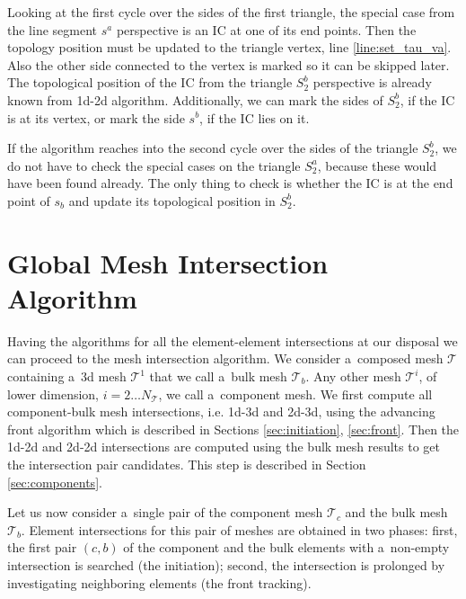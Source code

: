 Looking at the first cycle over the sides of the first triangle, the special case from the line segment $s^a$ perspective is
an IC at one of its end points. Then the topology position must be updated to the triangle vertex, line \ref{line:set_tau_va}.
Also the other side connected to the vertex is marked so it can be skipped later.
The topological position of the IC from the triangle $S^b_2$ perspective is already known from 1d-2d algorithm.
Additionally, we can mark the sides of $S^b_2$, if the IC is at its vertex, or mark the side $s^b$, if the IC lies on it.

If the algorithm reaches into the second cycle over the sides of the triangle $S^b_2$,
we do not have to check the special cases on the triangle $S^a_2$, because these would have been found already.
The only thing to check is whether the IC is at the end point of $s_b$ and update its topological position in $S^b_2$.

\section{Global Mesh Intersection Algorithm}
\label{sec:front_advancing}
Having the algorithms for all the element-element intersections at our disposal we can proceed to the mesh intersection algorithm. 
We consider a~composed mesh $\mathcal T$ containing a~3d mesh $\mathcal T^1$ that we call a~bulk mesh $\mathcal T_b$. Any other 
mesh $\mathcal T^i$, of lower dimension, $i=2\dots N_{\mathcal T}$, we call a~component mesh. 
We first compute all component-bulk mesh intersections, i.e. 1d-3d and 2d-3d, using the advancing front algorithm which is described in Sections 
\ref{sec:initiation}, \ref{sec:front}.
Then the 1d-2d and 2d-2d intersections are computed using the bulk mesh results to get the intersection pair candidates.
This step is described in Section \ref{sec:components}.

Let us now consider a~single pair of the component mesh $\mathcal T_c$ and the bulk mesh~$\mathcal T_b$. 
Element intersections for this pair of meshes are obtained in two phases: first, the 
first pair $(c,b)$ of the component and the bulk elements with a~non-empty intersection is searched (the initiation);
second, the intersection is prolonged by investigating neighboring elements (the front tracking).


